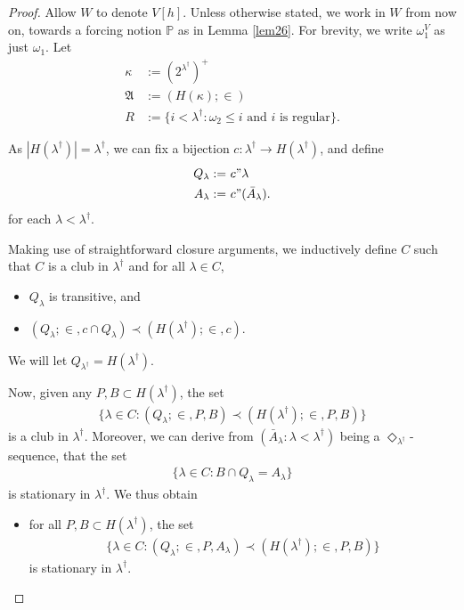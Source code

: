 \documentclass[12pt, twoside]{memoir}
\numberwithin{equation}{section}
\theoremstyle{definition}
\theoremstyle{remark}
\theoremstyle{definition}
\theoremstyle{definition}
\theoremstyle{definition}
\theoremstyle{remark}
\begin{document}
\begin{proof}
Allow $W$ to denote $V[h]$. Unless otherwise stated, we work in $W$ from now on, towards a forcing notion $\mathbb{P}$ as in Lemma \ref{lem26}. For brevity, we write $\omega_1^V$ as just $\omega_1$. Let 
\begin{align*}
    \kappa & := (2^{\lambda^{\dagger}})^+  \\
    \mathfrak{A} & := (H(\kappa); \in) \\
    R & := \{i < \lambda^{\dagger} : \omega_2 \leq i \text{ and } i \text{ is regular}\} \text{.}
\end{align*}

As $|H(\lambda^{\dagger})| = \lambda^{\dagger}$, we can fix a bijection $c : \lambda^{\dagger} \longrightarrow H(\lambda^{\dagger})$, and define
\begin{align*}
    Q_{\lambda} := \ & c" \lambda \\
    A_{\lambda} := \ & c" (\bar{A}_{\lambda}) \text{.}
\end{align*}
for each $\lambda < \lambda^{\dagger}$.

Making use of straightforward closure arguments, we inductively define $C$ such that $C$ is a club in $\lambda^{\dagger}$ and for all $\lambda \in C$, 
\begin{itemize}
    \item $Q_{\lambda}$ is transitive, and
    \item $(Q_{\lambda}; \in, c \cap Q_{\lambda}) \prec (H(\lambda^{\dagger}); \in, c)$.
\end{itemize}
We will let $Q_{\lambda^{\dagger}} = H(\lambda^{\dagger})$.

Now, given any $P, B \subset H(\lambda^{\dagger})$, the set
\begin{align*}
    \{\lambda \in C : (Q_{\lambda}; \in, P, B) \prec (H(\lambda^{\dagger}); \in, P, B)\}
\end{align*}
is a club in $\lambda^{\dagger}$. Moreover, we can derive from $(\bar{A}_{\lambda} : \lambda < \lambda^{\dagger})$ being a $\Diamond_{\lambda^{\dagger}}$-sequence, that the set
\begin{align*}
    \{\lambda \in C : B \cap Q_{\lambda} = A_{\lambda}\}
\end{align*}
is stationary in $\lambda^{\dagger}$. We thus obtain
\begin{itemize}[label=($\diamond$)]
    \item for all $P, B \subset H(\lambda^{\dagger})$, the set
    \begin{align*}
        \{\lambda \in C : (Q_{\lambda}; \in, P, A_{\lambda}) \prec (H(\lambda^{\dagger}); \in, P, B)\}
    \end{align*}
    is stationary in $\lambda^{\dagger}$.
\end{itemize}


\end{proof}
\end{document}
